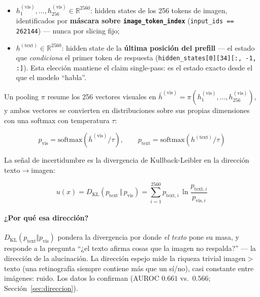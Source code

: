 \documentclass[12pt,a4paper]{article}
\newcommand{\pvis}{p_{\mathrm{vis}}}
\newcommand{\ptext}{p_{\mathrm{text}}}
\newcommand{\ux}{u(x)}
\newcommand{\KL}{D_{\mathrm{KL}}}
\begin{document}
\begin{itemize}[leftmargin=1.4em]
    \item $h^{(\mathrm{vis})}_1, \dots, h^{(\mathrm{vis})}_{256} \in
    \mathbb{R}^{2560}$: hidden states de los 256 tokens de imagen,
    identificados por \textbf{máscara sobre \texttt{image\_token\_index}}
    (\texttt{input\_ids == 262144}) --- nunca por slicing fijo;
    \item $h^{(\mathrm{text})} \in \mathbb{R}^{2560}$: hidden state de la
    \textbf{última posición del prefill} --- el estado que
    \emph{condiciona} el primer token de respuesta
    (\texttt{hidden\_states[0][34][:, -1, :]}). Esta elección mantiene el
    claim single-pass: es el estado exacto desde el que el modelo
    ``habla''.
\end{itemize}

Un pooling $\pi$ resume los 256 vectores visuales en
$\bar{h}^{(\mathrm{vis})} = \pi(h^{(\mathrm{vis})}_1, \dots,
h^{(\mathrm{vis})}_{256})$, y ambos vectores se convierten en
distribuciones sobre sus propias dimensiones con una softmax con
temperatura $\tau$:

\begin{equation}
\pvis = \mathrm{softmax}\!\left(\bar{h}^{(\mathrm{vis})} / \tau\right),
\qquad
\ptext = \mathrm{softmax}\!\left(h^{(\mathrm{text})} / \tau\right)
\label{eq:softmax}
\end{equation}

La señal de incertidumbre es la divergencia de Kullback-Leibler en la
dirección texto$\to$imagen:

\begin{equation}
\ux = \KL(\ptext \,\Vert\, \pvis)
= \sum_{i=1}^{2560} p_{\mathrm{text},i} \, \ln \frac{p_{\mathrm{text},i}}{p_{\mathrm{vis},i}}
\label{eq:kl}
\end{equation}

\paragraph{¿Por qué esa dirección?} $\KL(\ptext \Vert \pvis)$ pondera la
divergencia por donde \emph{el texto} pone su masa, y responde a la
pregunta ``¿el texto afirma cosas que la imagen no respalda?'' --- la
dirección de la alucinación. La dirección espejo mide la riqueza trivial
imagen$>$texto (una retinografía siempre contiene más que un sí/no), casi
constante entre imágenes: ruido. Los datos lo confirman (AUROC $0.661$
vs.\ $0.566$; Sección~\ref{sec:direccion}).
\end{document}
